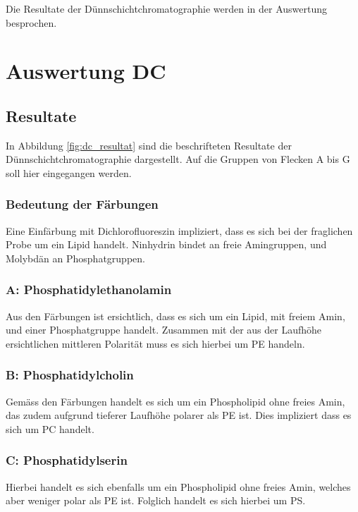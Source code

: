 \documentclass[a4paper,english]{scrreprt}
\begin{document}
Die Resultate der Dünnschichtchromatographie werden in der Auswertung besprochen.

\chapter{Auswertung DC}

\section{Resultate}

In Abbildung \ref{fig:dc_resultat} sind die beschrifteten Resultate der
Dünnschichtchromatographie dargestellt. Auf die Gruppen von Flecken A bis G
soll hier eingegangen werden.

\subsection{Bedeutung der Färbungen}

Eine Einfärbung mit Dichlorofluoreszin impliziert, dass es sich bei der
fraglichen Probe um ein Lipid handelt. Ninhydrin bindet an freie Amingruppen,
und Molybdän an Phosphatgruppen.

\subsection{A: Phosphatidylethanolamin}

Aus den Färbungen ist ersichtlich, dass es sich um ein Lipid, mit freiem Amin,
und einer Phosphatgruppe handelt. Zusammen mit der aus der Laufhöhe
ersichtlichen mittleren Polarität muss es sich hierbei um PE handeln.

\subsection{B: Phosphatidylcholin}

Gemäss den Färbungen handelt es sich um ein Phospholipid ohne freies Amin, das
zudem aufgrund tieferer Laufhöhe polarer als PE ist. Dies impliziert dass es
sich um PC handelt.

\subsection{C: Phosphatidylserin}

Hierbei handelt es sich ebenfalls um ein Phospholipid ohne freies Amin, welches
aber weniger polar als PE ist. Folglich handelt es sich hierbei um PS.
\end{document}
